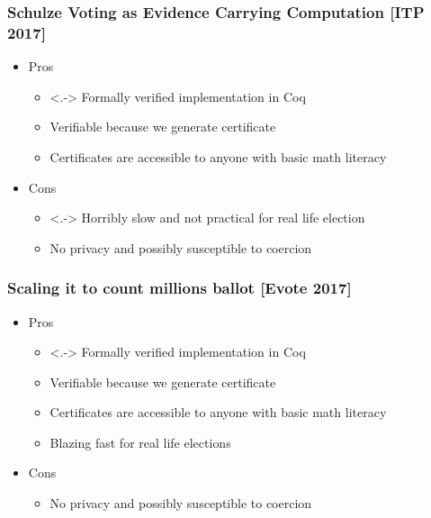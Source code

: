 \documentclass{beamer}
\begin{document}
\begin{frame}
\frametitle{Schulze Voting as Evidence Carrying Computation [ITP 2017]}
\begin{itemize}[<+->]
\item Pros 
\begin{itemize}
\item<.-> Formally verified implementation in Coq
\item Verifiable because we generate certificate
\item Certificates are accessible to anyone with 
      basic math literacy
\end{itemize}
\item Cons
\begin{itemize}
\item<.-> Horribly slow and not practical for real life election
\item No privacy and possibly susceptible to coercion
\end{itemize}
\end{itemize}
\end{frame}


\begin{frame}
\frametitle{Scaling it to count millions ballot [Evote 2017]}
\begin{itemize}[<+->]
\item Pros 
\begin{itemize}
\item<.-> Formally verified implementation in Coq
\item Verifiable because we generate certificate
\item Certificates are accessible to anyone with 
      basic math literacy
\item Blazing fast for real life elections
\end{itemize}
\item Cons
\begin{itemize}
\item No privacy and possibly susceptible to coercion
\end{itemize}
\end{itemize}

\end{frame}
\end{document}
